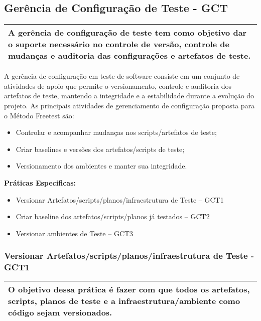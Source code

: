 \subsection{ Gerência de Configuração de Teste - GCT }
\label{sec:gct}

\begin{table}[!ht]
\centering
\begin{tabular}{|p{130mm}|}
\hline
A gerência de configuração de teste tem como objetivo dar o suporte necessário no controle de versão, controle de mudanças e auditoria das configurações e artefatos de teste. \\ 
\hline
\end{tabular}
\end{table}

A gerência de configuração em teste de software consiste em um conjunto de atividades de apoio que permite o versionamento, controle e auditoria dos artefatos de teste, mantendo a integridade e a estabilidade durante a evolução do projeto. As principais atividades de gerenciamento de configuração proposta para o Método Freetest são:

\begin{itemize}
    \item Controlar e acompanhar mudanças nos scripts/artefatos de teste;
    \item Criar baselines e versões dos artefatos/scripts de teste;
    \item Versionamento dos ambientes e manter sua integridade.
\end{itemize}

\textbf{Práticas Especificas: }
\begin{itemize}
    \item Versionar Artefatos/scripts/planos/infraestrutura de Teste – GCT1
    \item Criar baseline dos artefatos/scripts/planos já testados – GCT2
    \item Versionar ambientes de Teste – GCT3
\end{itemize}

\subsubsection{ Versionar Artefatos/scripts/planos/infraestrutura de Teste - GCT1 }
\label{sec:gct1}

\begin{table}[!ht]
\centering
\begin{tabular}{|p{130mm}|}
\hline
O objetivo dessa prática é fazer com que todos os artefatos, scripts, planos de teste e a infraestrutura/ambiente como código sejam versionados. \\ 
\hline
\end{tabular}
\end{table}

